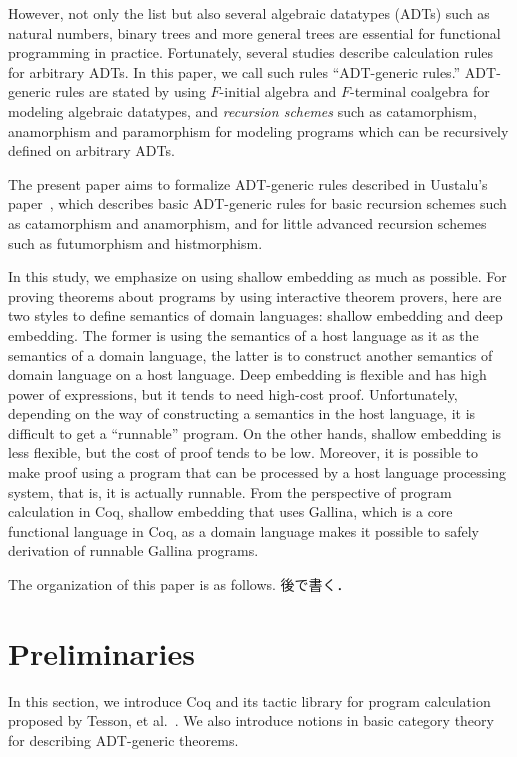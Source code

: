 \documentclass[runningheads, orivec]{llncs}
\begin{document}
However, not only the list but also several algebraic datatypes (ADTs) such as natural numbers, binary trees and more general trees are essential for functional programming in practice. Fortunately, several studies describe calculation rules for arbitrary ADTs\cite{}. In this paper, we call such rules ``ADT-generic rules.'' ADT-generic rules are stated by using \( F \)-initial algebra and \( F \)-terminal coalgebra for modeling algebraic datatypes, and \emph{recursion schemes} such as catamorphism, anamorphism and paramorphism for modeling programs which can be recursively defined on arbitrary ADTs. 

The present paper aims to formalize ADT-generic rules described in Uustalu's paper~\cite{Uustalu:99}, which describes basic ADT-generic rules for basic recursion schemes such as catamorphism and anamorphism, and for little advanced recursion schemes such as futumorphism and histmorphism. 

In this study, we emphasize on using shallow embedding as much as possible. For proving theorems about programs by using interactive theorem provers, here are two styles to define semantics of domain languages: shallow embedding and deep embedding. The former is using the semantics of a host language as it as the semantics of a domain language, the latter is to construct another semantics of domain language on a host language. Deep embedding is flexible and has high power of expressions, but it tends to need high-cost proof. Unfortunately, depending on the way of constructing a semantics in the host language, it is difficult to get a ``runnable'' program. On the other hands, shallow embedding is less flexible, but the cost of proof tends to be low. Moreover, it is possible to make proof using a program that can be processed by a host language processing system, that is, it is actually runnable. From the perspective of program calculation in Coq, shallow embedding that uses Gallina, which is a core functional language in Coq, as a domain language makes it possible to safely derivation of runnable Gallina programs.

The organization of this paper is as follows. 後で書く．

\section{Preliminaries}\label{sec2}

In this section, we introduce Coq and its tactic library for program calculation proposed by Tesson, et al.~\cite{Tesson:2010}. We also introduce notions in basic category theory for describing ADT-generic theorems. 
\end{document}
